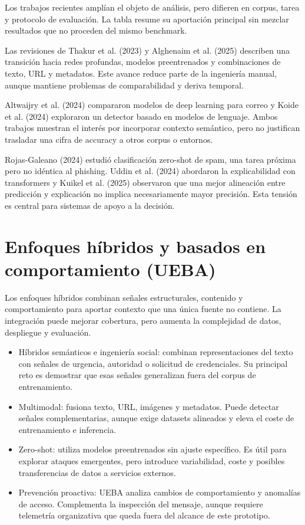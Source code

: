 \documentclass[11pt,a4paper,oneside]{report}
\begin{document}
Los trabajos recientes amplían el objeto de análisis, pero difieren en corpus, tarea y protocolo de evaluación. La tabla resume su aportación principal sin mezclar resultados que no proceden del mismo benchmark.

Las revisiones de Thakur et al. (2023) y Alghenaim et al. (2025) describen una transición hacia redes profundas, modelos preentrenados y combinaciones de texto, URL y metadatos. Este avance reduce parte de la ingeniería manual, aunque mantiene problemas de comparabilidad y deriva temporal.

Altwaijry et al. (2024) compararon modelos de deep learning para correo y Koide et al. (2024) exploraron un detector basado en modelos de lenguaje. Ambos trabajos muestran el interés por incorporar contexto semántico, pero no justifican trasladar una cifra de accuracy a otros corpus o entornos.

Rojas-Galeano (2024) estudió clasificación zero-shot de spam, una tarea próxima pero no idéntica al phishing. Uddin et al. (2024) abordaron la explicabilidad con transformers y Kuikel et al. (2025) observaron que una mejor alineación entre predicción y explicación no implica necesariamente mayor precisión. Esta tensión es central para sistemas de apoyo a la decisión.

\section{Enfoques híbridos y basados en comportamiento (UEBA)}

Los enfoques híbridos combinan señales estructurales, contenido y comportamiento para aportar contexto que una única fuente no contiene. La integración puede mejorar cobertura, pero aumenta la complejidad de datos, despliegue y evaluación.

\begin{itemize}
  \item Híbridos semánticos e ingeniería social: combinan representaciones del texto con señales de urgencia, autoridad o solicitud de credenciales. Su principal reto es demostrar que esas señales generalizan fuera del corpus de entrenamiento.
  \item Multimodal: fusiona texto, URL, imágenes y metadatos. Puede detectar señales complementarias, aunque exige datasets alineados y eleva el coste de entrenamiento e inferencia.
  \item Zero-shot: utiliza modelos preentrenados sin ajuste específico. Es útil para explorar ataques emergentes, pero introduce variabilidad, coste y posibles transferencias de datos a servicios externos.
  \item Prevención proactiva: UEBA analiza cambios de comportamiento y anomalías de acceso. Complementa la inspección del mensaje, aunque requiere telemetría organizativa que queda fuera del alcance de este prototipo.
\end{itemize}
\end{document}
